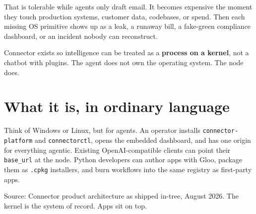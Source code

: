 \documentclass[10pt]{article}
\newcommand{\muted}[1]{\textcolor{textmuted}{#1}}
\begin{document}
That is tolerable while agents only draft email. It becomes expensive the moment they touch production systems, customer data, codebases, or spend. Then each missing OS primitive shows up as a leak, a runaway bill, a fake-green compliance dashboard, or an incident nobody can reconstruct.

Connector exists so intelligence can be treated as a \textbf{process on a kernel}, not a chatbot with plugins. The agent does not own the operating system. The node does.

\section{What it is, in ordinary language}

Think of Windows or Linux, but for agents. An operator installs \texttt{connector-platform} and \texttt{connectorctl}, opens the embedded dashboard, and has one origin for everything agentic. Existing OpenAI-compatible clients can point their \texttt{base\_url} at the node. Python developers can author apps with Gloo, package them as \texttt{.cpkg} installers, and burn workflows into the same registry as first-party apps.

\vspace{0.25em}
\begin{center}
\end{center}
{\footnotesize\muted{Source: Connector product architecture as shipped in-tree, August 2026. The kernel is the system of record. Apps sit on top.}}
\end{document}
